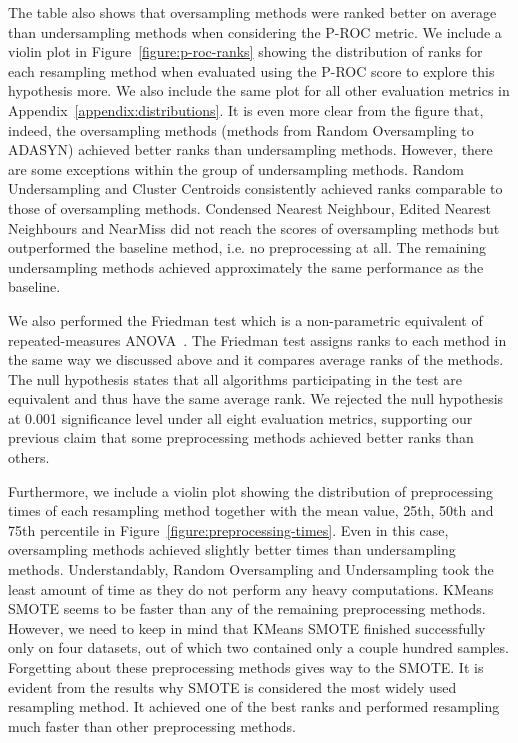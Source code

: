 The table also shows that oversampling methods were ranked better on average than undersampling
methods when considering the P-ROC metric. We include a violin plot in
Figure~\ref{figure:p-roc-ranks} showing the distribution of ranks for each resampling method when
evaluated using the P-ROC score to explore this hypothesis more. We also include the same plot for
all other evaluation metrics in Appendix~\ref{appendix:distributions}. It is even more clear from
the figure that, indeed, the oversampling methods (methods from Random Oversampling to ADASYN)
achieved better ranks than undersampling methods. However, there are some exceptions within the
group of undersampling methods. Random Undersampling and Cluster Centroids consistently achieved
ranks comparable to those of oversampling methods. Condensed Nearest Neighbour, Edited Nearest
Neighbours and NearMiss did not reach the scores of oversampling methods but outperformed the
baseline method, i.e. no preprocessing at all. The remaining undersampling methods achieved
approximately the same performance as the baseline.

We also performed the Friedman test which is a non-parametric equivalent of repeated-measures
ANOVA~\cite{stats-comparison}. The Friedman test assigns ranks to each method in the same way we
discussed above and it compares average ranks of the methods. The null hypothesis states that all
algorithms participating in the test are equivalent and thus have the same average rank. We
rejected the null hypothesis at 0.001 significance level under all eight evaluation metrics,
supporting our previous claim that some preprocessing methods achieved better ranks than others.

Furthermore, we include a violin plot showing the distribution of preprocessing times of each
resampling method together with the mean value, 25th, 50th and 75th percentile in
Figure~\ref{figure:preprocessing-times}. Even in this case, oversampling methods achieved slightly
better times than undersampling methods. Understandably, Random Oversampling and Undersampling took
the least amount of time as they do not perform any heavy computations. KMeans SMOTE seems to be
faster than any of the remaining preprocessing methods. However, we need to keep in mind that
KMeans SMOTE finished successfully only on four datasets, out of which two contained only a couple
hundred samples. Forgetting about these preprocessing methods gives way to the SMOTE. It is evident
from the results why SMOTE is considered the most widely used resampling method. It achieved one of
the best ranks and performed resampling much faster than other preprocessing methods.

